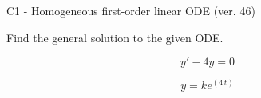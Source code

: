 \begin{exercise}
  \begin{exerciseTitle}C1 - Homogeneous first-order linear ODE (ver. 46)\end{exerciseTitle}
  \begin{exerciseStatement}
    
Find the general solution to the given ODE.

    
\[y'-4y=0\]

  \end{exerciseStatement}
  \begin{exerciseAnswer}
    
\[y= k e^{\left(4 \, t\right)}\]

  \end{exerciseAnswer}
\end{exercise}